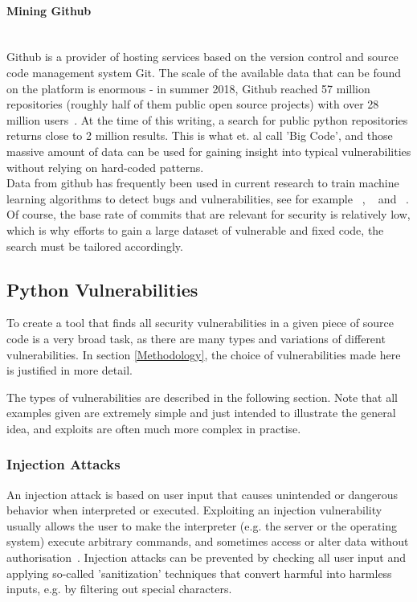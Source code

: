 \documentclass[
	a4paper,
	pagesize,
	pdftex,
	12pt,
	twoside, %
	BCOR=5mm, %
	ngerman,
	fleqn,
	final,
	]{scrartcl}
\begin{document}
\paragraph{Mining Github}\mbox{}\\
Github is a provider of hosting services based on the version control and source code management system Git. The scale of the available data that can be found on the platform is enormous - in summer 2018, Github reached 57 million repositories (roughly half of them public open source projects) with over 28 million users~\cite{Github.com.b}. At the time of this writing, a search for public python repositories returns close to 2 million results. This is what \cite{Allamanis.2018} et. al call 'Big Code', and those massive amount of data can be used for gaining insight into typical vulnerabilities without relying on hard-coded patterns.\\
Data from github has frequently been used in current research to train machine learning algorithms to detect bugs and vulnerabilities, see for example ~\cite{Zhou.2017}, ~\cite{Russell.2018} and ~\cite{Liu.2018}. Of course, the base rate of commits that are relevant for security is relatively low, which is why efforts to gain a large dataset of vulnerable and fixed code, the search must be tailored accordingly.\\ 


\subsection{Python Vulnerabilities}

To create a tool that finds all security vulnerabilities in a given piece of source code is a very broad task, as there are many types and variations of different vulnerabilities. In section \ref{Methodology}, the choice of vulnerabilities made here is justified in more detail. 

The types of vulnerabilities are described in the following section. Note that all examples given are extremely simple and just intended to illustrate the general idea, and exploits are often much more complex in practise.

\subsubsection{Injection Attacks}
An injection attack is based on user input that causes unintended or dangerous behavior when interpreted or executed. Exploiting an injection vulnerability usually allows the user to make the interpreter (e.g. the server or the operating system) execute arbitrary commands, and sometimes access or alter data without authorisation~\cite{Micheelsen.2016}. Injection attacks can be prevented by checking all user input and applying so-called 'sanitization' techniques that convert harmful into harmless inputs, e.g. by filtering out special characters. 
\end{document}
